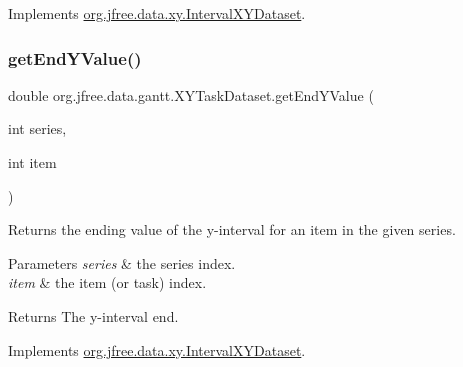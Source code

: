 Implements \mbox{\hyperlink{interfaceorg_1_1jfree_1_1data_1_1xy_1_1_interval_x_y_dataset_ae938af574bad07e7f47a8b423223ef9b}{org.\+jfree.\+data.\+xy.\+Interval\+X\+Y\+Dataset}}.

\mbox{\label{classorg_1_1jfree_1_1data_1_1gantt_1_1_x_y_task_dataset_a8524d9e1fec8959bd9dc9fe78688d5cf}} 
\subsubsection{\texorpdfstring{get\+End\+Y\+Value()}{getEndYValue()}}
{\footnotesize\ttfamily double org.\+jfree.\+data.\+gantt.\+X\+Y\+Task\+Dataset.\+get\+End\+Y\+Value (\begin{DoxyParamCaption}\item[{int}]{series,  }\item[{int}]{item }\end{DoxyParamCaption})}

Returns the ending value of the y-\/interval for an item in the given series.


\begin{DoxyParams}{Parameters}
{\em series} & the series index. \\
\hline
{\em item} & the item (or task) index.\\
\hline
\end{DoxyParams}
\begin{DoxyReturn}{Returns}
The y-\/interval end. 
\end{DoxyReturn}


Implements \mbox{\hyperlink{interfaceorg_1_1jfree_1_1data_1_1xy_1_1_interval_x_y_dataset_a0538ada774aad34ec95edbb84c1a82e1}{org.\+jfree.\+data.\+xy.\+Interval\+X\+Y\+Dataset}}.

\mbox{\label{classorg_1_1jfree_1_1data_1_1gantt_1_1_x_y_task_dataset_a48fa86ab7e66f3a99100b7ffac52597e}} 
